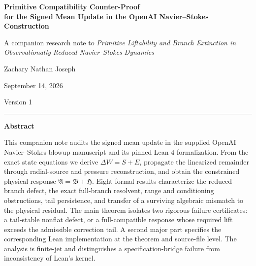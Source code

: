 \documentclass[12pt]{article}
\theoremstyle{plain}
\theoremstyle{definition}
\theoremstyle{remark}
\newcommand{\Comp}{\mathfrak A}
\newcommand{\Red}{\mathfrak B}
\newcommand{\Hidden}{\mathfrak H}
\begin{document}
\begin{titlepage}
\thispagestyle{empty}
\begin{center}
\vspace*{0.68in}
{\LARGE\bfseries Primitive Compatibility Counter-Proof\\[0.17in]
for the Signed Mean Update in the OpenAI Navier--Stokes Construction\par}
\vspace{0.25in}
{\large A companion research note to \emph{Primitive Liftability and Branch Extinction in Observationally Reduced Navier--Stokes Dynamics}\par}
\vspace{0.46in}
{\large Zachary Nathan Joseph\par}
\vspace{0.07in}
{\normalsize September 14, 2026\par}
\vspace{0.08in}
{\normalsize Version 1\par}
\vspace{0.40in}
\rule{0.82\textwidth}{0.4pt}
\end{center}

\vspace{0.26in}
\begin{center}
\begin{minipage}{0.88\textwidth}
\begin{center}
{\normalsize\bfseries Abstract}
\end{center}
\vspace{0.02in}
\small{}
This companion note audits the signed mean update in the supplied OpenAI Navier--Stokes blowup manuscript and its pinned Lean 4 formalization. From the exact state equations we derive \(\Delta W=S+E\), propagate the linearized remainder through radial-source and pressure reconstruction, and obtain the constrained physical response \(\Comp=\Red+\Hidden\). Eight formal results characterize the reduced-branch defect, the exact full-branch resolvent, range and conditioning obstructions, tail persistence, and transfer of a surviving algebraic mismatch to the physical residual. The main theorem isolates two rigorous failure certificates: a tail-stable nonflat defect, or a full-compatible response whose required lift exceeds the admissible correction tail. A second major part specifies the corresponding Lean implementation at the theorem and source-file level. The analysis is finite-jet and distinguishes a specification-bridge failure from inconsistency of Lean's kernel.
\end{minipage}
\end{center}
\vfill
\end{titlepage}
\setcounter{page}{2}
\end{document}
